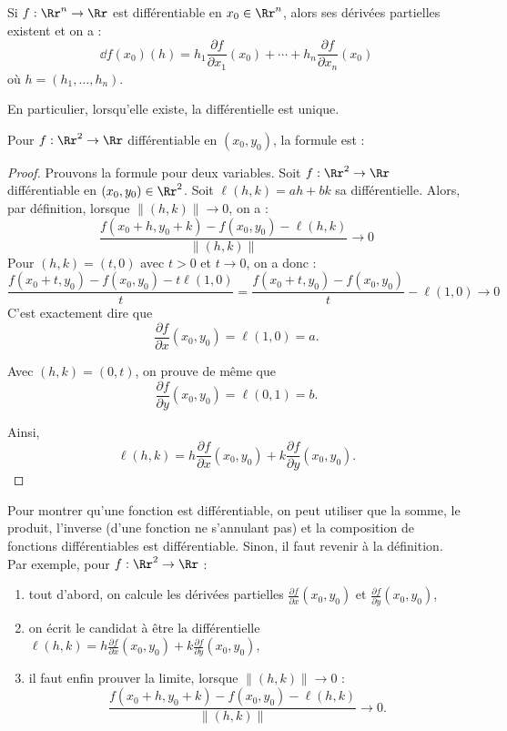 \documentclass[11pt, class=report,crop=false]{standalone}
\begin{document}
\begin{proposition}
\label{prop:differ}
Si $f : \Rr^n \to \Rr$ est différentiable en $x_0 \in \Rr^n$, alors ses dérivées partielles existent et on a :
$$
\dd f(x_0)(h) = 
h_1 \frac{\partial f}{\partial x_1}(x_0)  + \cdots + h_n \frac{\partial f}{\partial x_n}(x_0)  
$$
où $h = (h_1,\ldots,h_n)$.
\end{proposition}
En particulier, lorsqu'elle existe, la différentielle est unique.

\bigskip

Pour $f : \Rr^2 \to \Rr$ différentiable en $(x_0,y_0)$, la formule est :

\begin{proof}
Prouvons la formule pour deux variables.
Soit $f : \Rr^2 \to \Rr$ différentiable en $(x_0,y_0) \in \Rr^2$.
Soit $\ell(h,k) = ah + bk$ sa différentielle. Alors, par définition, lorsque $\|(h,k)\| \to 0$, on a :
$$\frac{f(x_0+ h,y_0+k) - f(x_0,y_0) - \ell(h,k)}{\|(h,k)\|} \longrightarrow 0$$
Pour $(h,k) = (t,0)$ avec $t>0$ et $t \to 0$, on a donc :
$$\frac{f(x_0+ t,y_0) - f(x_0,y_0) - t\ell(1,0)}{t}
= \frac{f(x_0+ t,y_0) - f(x_0,y_0)}{t} - \ell(1,0) \longrightarrow  0$$
C'est exactement dire que 
$$\frac{\partial f}{\partial x}(x_0,y_0) = \ell(1,0) = a.$$

Avec $(h,k) = (0,t)$, on prouve de même que 
$$\frac{\partial f}{\partial y}(x_0,y_0) = \ell(0,1) = b.$$

Ainsi,
$$\ell(h,k) = h \frac{\partial f}{\partial x}(x_0,y_0) +
k \frac{\partial f}{\partial y}(x_0,y_0).$$
\end{proof}




Pour montrer qu'une fonction est différentiable, on peut utiliser que la somme, le produit, l'inverse (d'une fonction ne s'annulant pas) et la composition de fonctions différentiables est différentiable. Sinon, il faut revenir à la définition. Par exemple, pour $f : \Rr^2 \to \Rr$ : 
\begin{enumerate}
  \item tout d'abord, on calcule les dérivées partielles 
  $\frac{\partial f}{\partial x}(x_0,y_0)$ et  $\frac{\partial f}{\partial y}(x_0,y_0)$, 
  
  \item on écrit le  candidat à être la différentielle $
\ell(h,k) = 
h \frac{\partial f}{\partial x}(x_0,y_0) + 
k \frac{\partial f}{\partial y}(x_0,y_0)
$,

  \item il faut enfin prouver la limite, lorsque $\|(h,k)\| \to 0$ :
$$\frac{f(x_0+ h,y_0+k) - f(x_0,y_0) - \ell(h,k)}{\|(h,k)\|} \longrightarrow  0.$$
  
\end{enumerate}
\end{document}
